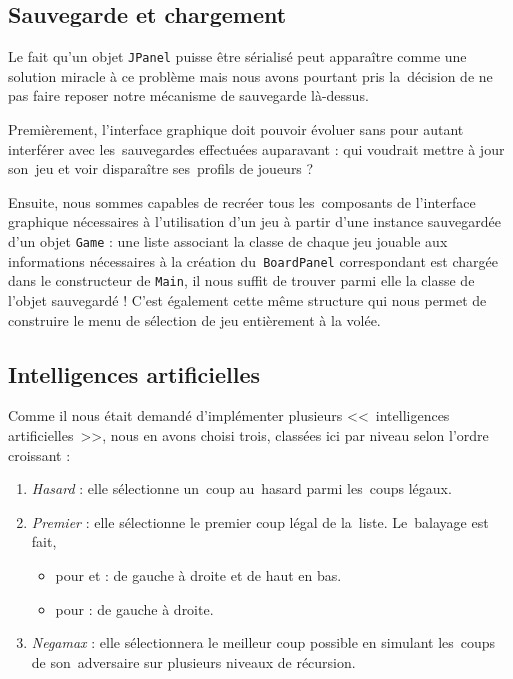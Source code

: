 \subsection{Sauvegarde et chargement}
Le fait qu'un objet \texttt{JPanel} puisse être sérialisé peut apparaître comme une solution miracle à ce problème 
mais nous avons pourtant pris la~décision de ne pas faire reposer notre mécanisme de sauvegarde là-dessus.

Premièrement, l'interface graphique doit pouvoir évoluer sans pour autant interférer avec les~sauvegardes effectuées auparavant : 
qui voudrait mettre à jour son~jeu et voir disparaître ses~profils de joueurs ?

Ensuite, nous sommes capables de recréer tous les~composants de l'interface graphique nécessaires à l'utilisation d'un jeu 
à partir d'une instance sauvegardée d'un objet \texttt{Game} : une liste associant la classe de chaque jeu jouable 
aux informations nécessaires à la création du~\texttt{BoardPanel} correspondant est chargée dans le constructeur de \texttt{Main}, 
il nous suffit de trouver parmi elle la classe de l'objet sauvegardé ! C'est également cette même structure 
qui nous permet de construire le menu de sélection de jeu entièrement à la volée.


\subsection{Intelligences artificielles}
Comme il nous était demandé d'implémenter plusieurs <<~intelligences artificielles~>>, 
nous en avons choisi trois, classées ici par niveau selon l'ordre croissant :

\begin{enumerate}
	\item \emph{Hasard} : elle sélectionne un~coup au~hasard parmi les~coups légaux.
    \item \emph{Premier} : elle sélectionne le premier coup légal de la~liste. Le~balayage est fait,
    \begin{itemize}
        \item pour \oth{} et \ttt{} : de gauche à droite et de haut en bas.
        \item pour \cf{} : de gauche à droite.
    \end{itemize}
    \item \emph{Negamax} : elle sélectionnera le meilleur coup possible en simulant les~coups de son~adversaire sur plusieurs niveaux de récursion.
\end{enumerate}